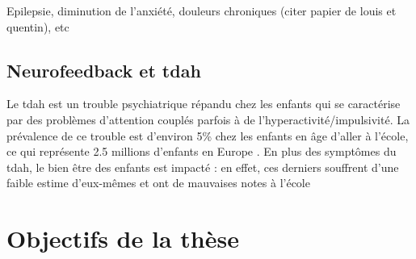 Epilepsie, diminution de l’anxiété, douleurs chroniques (citer papier de louis et quentin), etc

\subsection{Neurofeedback et \gls{tdah}}

Le \gls{tdah} est un trouble psychiatrique répandu chez les enfants qui se caractérise par des problèmes d'attention couplés parfois à de l'hyperactivité/impulsivité. 
La prévalence de ce trouble est d'environ 5\% chez les enfants en âge d'aller à l'école, ce qui représente 2.5 millions d'enfants en Europe \citep{DSM-5}. 
En plus des symptômes du \gls{tdah}, le bien être des enfants est impacté : en effet, ces derniers souffrent d'une faible estime d'eux-mêmes et ont de mauvaises notes à l'école






\section{Objectifs de la thèse}

